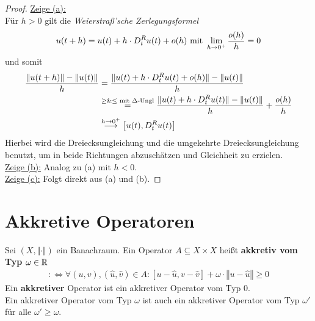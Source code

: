 \begin{proof}
\underline{Zeige (a):}\\
Für $h>0$ gilt die \textit{Weierstraß'sche Zerlegungsformel}
\begin{align*}
u(t+h)=u(t)+h\cdot D_t^R u(t)+o(h)\mit\lim\limits_{h\to0^+}\frac{o(h)}{h}=0
\end{align*}
und somit
\begin{align*}
\frac{\Vert u(t+h)\Vert-\Vert u(t)\Vert}{h}
&=
\frac{\Vert u(t)+h\cdot D_t^R u(t)+ o(h)\Vert-\Vert u(t)\Vert}{h}\\
&\stackeq{\geq\&\leq\mit\Delta\text{-Ungl}}
\frac{\Vert u(t)+h\cdot D_t^R u(t)\Vert-\Vert u(t)\Vert}{h}+\frac{o(h)}{h}\\
&\stackrel{h\to0^+}{\longrightarrow} \left[ u(t), D_t^R u(t)\right]
\end{align*}
Hierbei wird die Dreiecksungleichung und die umgekehrte Dreiecksungleichung benutzt, um in beide Richtungen abzuschätzen und Gleichheit zu erzielen.\\

\underline{Zeige (b):}
Analog zu (a) mit $h<0$.\\

\underline{Zeige (c):}
Folgt direkt aus (a) und (b).
\end{proof}

\section{Akkretive Operatoren}
\begin{definition}
Sei $(X,\Vert\cdot\Vert)$ ein Banachraum. Ein Operator $A\subseteq X\times X$ heißt \textbf{akkretiv vom Typ $\omega\in\R$}
\begin{align*}
:\Longleftrightarrow\forall (u,v),(\hat{u},\hat{v})\in A:\left[ u-\hat{u},v-\hat{v}\right]+\omega\cdot\left\Vert u-\hat{u}\right\Vert\geq0
\end{align*}
Ein \textbf{akkretiver} Operator  ist ein akkretiver Operator vom Typ $0$.\\
Ein akkretiver Operator vom Typ $\omega$ ist auch ein akkretiver Operator vom Typ $\omega'$ für alle $\omega'\geq\omega$.
\end{definition}

